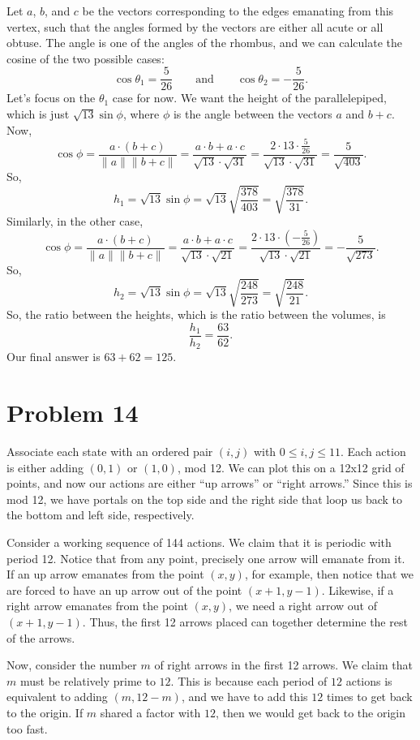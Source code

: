 \documentclass{scrartcl}
\begin{document}
Let $a$, $b$, and $c$ be the vectors corresponding to the edges emanating from this vertex,
such that the angles formed by the vectors are either all acute or all obtuse.
The angle is one of the angles of the rhombus,
and we can calculate the cosine of the two possible cases:
\[ \cos \theta_1 = \frac{5}{26} \qquad \text{and} \qquad \cos \theta_2 = -\frac{5}{26}. \]
Let's focus on the $\theta_1$ case for now.
We want the height of the parallelepiped, which
is just $\sqrt{13} \sin \phi$, where $\phi$ is the angle between the vectors
$a$ and $b+c$.
Now,
\[ \cos \phi = \frac{a \cdot (b+c)}{\|a\| \|b+c\|} = \frac{a \cdot b + a \cdot c}{\sqrt{13} \cdot \sqrt{31}} = \frac{2 \cdot 13 \cdot \frac{5}{26}}{\sqrt{13} \cdot \sqrt{31}} = \frac{5}{\sqrt{403}}. \]
So,
\[ h_1 = \sqrt{13} \sin \phi = \sqrt{13} \sqrt{\frac{378}{403}} = \sqrt{\frac{378}{31}}. \]
Similarly, in the other case,
\[ \cos \phi = \frac{a \cdot (b+c)}{\|a\| \|b+c\|} = \frac{a \cdot b + a \cdot c}{\sqrt{13} \cdot \sqrt{21}} = \frac{2 \cdot 13 \cdot \left(-\frac{5}{26}\right)}{\sqrt{13} \cdot \sqrt{21}} = -\frac{5}{\sqrt{273}}. \]
So,
\[ h_2 = \sqrt{13} \sin \phi = \sqrt{13} \sqrt{\frac{248}{273}} = \sqrt{\frac{248}{21}}. \]
So, the ratio between the heights, which is the ratio between the volumes, is
\[ \frac{h_1}{h_2} = \frac{63}{62}. \]
Our final answer is $63 + 62 = \boxed{125}$.

\section*{Problem 14}
Associate each state with an ordered pair $(i,j)$
with $0 \le i,j \le 11$.
Each action is either adding $(0,1)$ or $(1,0)$, mod 12.
We can plot this on a 12x12 grid of points, and now
our actions are either ``up arrows'' or ``right arrows.''
Since this is mod 12, we have portals on the top side and the right side
that loop us back to the bottom and left side, respectively.

Consider a working sequence of 144 actions.
We claim that it is periodic with period 12.
Notice that from any point, precisely one arrow will emanate from it.
If an up arrow emanates from the point $(x,y)$, for example,
then notice that we are forced to have an up arrow out of the point $(x+1,y-1)$.
Likewise, if a right arrow emanates from the point $(x,y)$,
we need a right arrow out of $(x+1,y-1)$. Thus, the first 12 arrows placed
can together determine the rest of the arrows.

Now, consider the number $m$ of right arrows in the first 12 arrows.
We claim that $m$ must be relatively prime to $12$.
This is because each period of $12$ actions is equivalent to adding $(m,12-m)$,
and we have to add this $12$ times to get back to the origin.
If $m$ shared a factor with $12$, then we would get back to the origin too fast.
\end{document}

